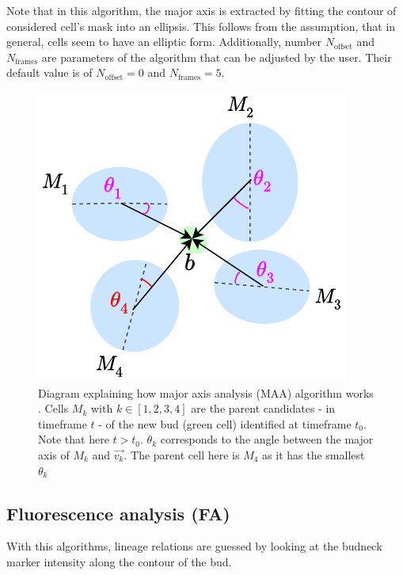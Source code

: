 \documentclass{TP}
\begin{document}
Note that in this algorithm, the major axis is extracted by fitting the contour of considered cell's mask into an ellipsis. This follows from the assumption, that in general, cells seem to have an elliptic form. Additionally, number $N_{\text{offset}}$ and $N_{\text{frames}}$ are parameters of the algorithm that can be adjusted by the user. Their default value is of $N_{\text{offset}}=0$ and $N_{\text{frames}}=5$.

\begin{figure}[h]
\centering
\includegraphics[width=1\linewidth]{Schemas et illustrations/maa.pdf}
\captionsetup{justification=raggedright}
\caption{ Diagram explaining how major axis analysis (MAA) algorithm works . Cells $M_k$ with $k \in [1,2,3,4]$ are the parent candidates - in timeframe $t$ - of the new bud (green cell) identified at timeframe $t_0$. Note that here $t > t_0$. $\theta_{k} $ corresponds to the angle between the major axis of $M_k$ and $\vec{v_k}$. The parent cell here is $M_4$ as it has the smallest $\theta_k$}
\label{fig: maa algo}
\end{figure}

\subsection{Fluorescence analysis (FA)} 
With this algorithms, lineage relations are guessed by looking at the budneck marker intensity along the contour of the bud.
\end{document}
